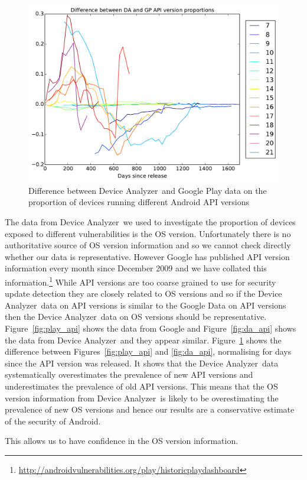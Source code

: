\documentclass[conference,a4paper,twoside]{IEEEtran}
\let\OldTodo\todo
\renewcommand{\todo}{\OldTodo[inline]}
\newcommand{\todolater}[1]{}%
\newcommand{\da}{Device Analyzer}
\begin{document}
\begin{figure}
 \centering
 \includegraphics[width=\columnwidth]{figures/api_gpcomp_rdiff}
 \caption{Difference between \da\ and Google Play data on the proportion of devices running different Android API versions}
 \label{fig:da_gp_comp_diff}
\end{figure}
The data from \da\ we used to investigate the proportion of devices exposed to different vulnerabilities is the OS version.
Unfortunately there is no authoritative source of OS version information and so we cannot check directly whether our data is representative.
However Google has published API version information every month since December 2009 and we have collated this information.\footnote{\url{http://androidvulnerabilities.org/play/historicplaydashboard}}
While API versions are too coarse grained to use for security update detection they are closely related to OS versions and so if the \da\ data on API versions is similar to the Google Data on API versions then the \da\ data on OS versions should be representative.
Figure~\ref{fig:play_api} shows the data from Google and Figure~\ref{fig:da_api} shows the data from \da\ and they appear similar.
Figure~\ref{fig:da_gp_comp_diff} shows the difference between Figures~\ref{fig:play_api} and \ref{fig:da_api}, normalising for days since the API version was released.
It shows that the \da\ data systematically overestimates the prevalence of new API versions and underestimates the prevalence of old API versions.
This means that the OS version information from \da\ is likely to be overestimating the prevalence of new OS versions and hence our results are a conservative estimate of the security of Android.
\todolater{we want a statistical metric to claim this strongly with.}
This allows us to have confidence in the OS version information.
\end{document}
